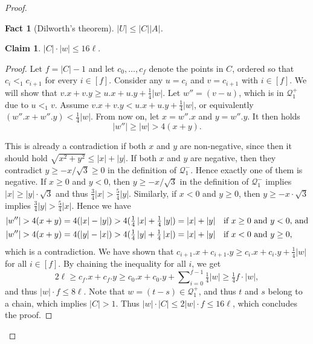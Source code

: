 \documentclass[11pt, letterpaper]{article}
\theoremstyle{plain}
\newtheorem{fact}{Fact}
\theoremstyle{definition}
\newtheorem{claim}{Claim}
\theoremstyle{remark}
\newcommand{\Q}{\mathcal{Q}}
\newcommand{\absolute}[1]{\left\lvert#1\right\rvert}
\begin{document}
\begin{proof}
\begin{fact}[Dilworth's theorem]\label{dilworth}
	$\absolute{U} \le \absolute{C} \absolute{A}$.
\end{fact}

\begin{claim}\label{C_ineq}
	$\absolute{C} \cdot \absolute{w} \leq 16\ell$. 
	\begin{proof}
		Let $f = \absolute{C} - 1$ and
		let $c_0, \dots, c_{f}$ denote the points in $C$, ordered so that $c_i <_1 c_{i + 1}$ for every $i \in [f]$.
		Consider any $u = c_i$ and $v = c_{i + 1}$ with $i \in [f]$. We will show that $v.x + v.y \geq u.x + u.y + \frac14\absolute{w}$. 		
		Let $w'' = (v - u)$, which is in $\Q_1^+$ due to $u <_1 v$. Assume $v.x + v.y < u.x + u.y + \frac14\absolute{w}$, or equivalently $(w''.x + w''.y) < \frac14\absolute{w}$. From now on, let $x = w''.x$ and $y = w''.y$. It then holds $$\absolute{w''} \geq \absolute{w} > 4(x + y).$$
		
		This is already a contradiction if both $x$ and $y$ are non-negative, since then it should hold $\sqrt{x^2 + y^2} \leq \absolute{x} + \absolute{y}$. If both $x$ and $y$ are negative, then they contradict $y \geq -x/\sqrt{3} \geq 0$ in the definition of $\Q_1^-$. Hence exactly one of them is negative. If $x \geq 0$ and $y < 0$, then $y \geq -x / \sqrt{3}$ in the definition of $\Q_1^-$ implies $\absolute{x} \geq \absolute{y}\cdot \sqrt{3}$ and thus $\frac34\absolute{x} > \frac54\absolute{y}$. Similarly, if $x < 0$ and $y \geq 0$, then $y \geq -x \cdot \sqrt{3}$ implies $\frac34\absolute{y} > \frac54\absolute{x}$. Hence we have
	\begin{alignat*}{1}	
		\absolute{w''} > 4(x + y) = 
		4(\absolute{x} - \absolute{y}) > 
		4(\tfrac14\absolute{x} + \tfrac14\absolute{y}) = 
		\absolute{x} + \absolute{y}&\text{\quad if $x \geq 0$ and $y < 0$, and}\\
		\absolute{w''} > 4(x + y) = 
		4(\absolute{y} - \absolute{x}) > 
		4(\tfrac14\absolute{y} + \tfrac14\absolute{x}) = 
		\absolute{x} + \absolute{y}&\text{\quad if $x < 0$ and $y \geq 0$,}
	\end{alignat*}
	which is a contradiction.
	We have shown that $c_{i + 1}.x + c_{i + 1}.y \geq c_i.x + c_i.y + \frac14\absolute{w}$ for all $i \in [f]$. By chaining the inequality for all $i$, we get $$2\ell \geq c_f.x + c_f.y \geq c_0.x + c_0.y + \sum\nolimits_{i = 0}^{f - 1} \tfrac14\absolute{w} \geq \tfrac14f\cdot{\absolute{w}},$$ and thus $\absolute{w} \cdot f \leq 8\ell$. Note that $w = (t - s) \in \Q_1^+$, and thus $t$ and $s$ belong to a chain, which implies $\absolute{C} > 1$. Thus $\absolute{w} \cdot \absolute{C} \leq 2\absolute{w} \cdot f \leq 16\ell$, which concludes the proof.
	\end{proof}%
\end{claim}


\end{proof}
\end{document}
